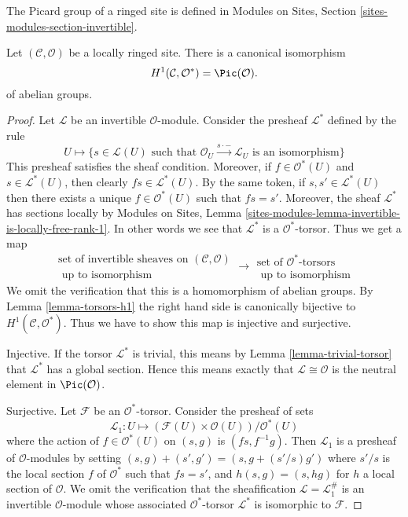 \noindent
The Picard group of a ringed site is defined in
Modules on Sites, Section \ref{sites-modules-section-invertible}.

\begin{lemma}
\label{lemma-h1-invertible}
Let $(\mathcal{C}, \mathcal{O})$ be a locally ringed site.
There is a canonical isomorphism
$$
H^1(\mathcal{C}, \mathcal{O}^*) = \Pic(\mathcal{O}).
$$
of abelian groups.
\end{lemma}

\begin{proof}
Let $\mathcal{L}$ be an invertible $\mathcal{O}$-module.
Consider the presheaf $\mathcal{L}^*$ defined by the rule
$$
U \longmapsto \{s \in \mathcal{L}(U)
\text{ such that } \mathcal{O}_U \xrightarrow{s \cdot -} \mathcal{L}_U
\text{ is an isomorphism}\}
$$
This presheaf satisfies the sheaf condition. Moreover, if
$f \in \mathcal{O}^*(U)$ and $s \in \mathcal{L}^*(U)$, then clearly
$fs \in \mathcal{L}^*(U)$. By the same token, if $s, s' \in \mathcal{L}^*(U)$
then there exists a unique $f \in \mathcal{O}^*(U)$ such that
$fs = s'$. Moreover, the sheaf $\mathcal{L}^*$ has sections locally
by Modules on Sites, Lemma
\ref{sites-modules-lemma-invertible-is-locally-free-rank-1}.
In other words we
see that $\mathcal{L}^*$ is a $\mathcal{O}^*$-torsor. Thus we get
a map
$$
\begin{matrix}
\text{set of invertible sheaves on }(\mathcal{C}, \mathcal{O}) \\
\text{ up to isomorphism}
\end{matrix}
\longrightarrow
\begin{matrix}
\text{set of }\mathcal{O}^*\text{-torsors} \\
\text{ up to isomorphism}
\end{matrix}
$$
We omit the verification that this is a homomorphism of abelian groups.
By
Lemma \ref{lemma-torsors-h1}
the right hand side is canonically
bijective to $H^1(\mathcal{C}, \mathcal{O}^*)$.
Thus we have to show this map is injective and surjective.

\medskip\noindent
Injective. If the torsor $\mathcal{L}^*$ is trivial, this means by
Lemma \ref{lemma-trivial-torsor}
that $\mathcal{L}^*$ has a global section.
Hence this means exactly that $\mathcal{L} \cong \mathcal{O}$ is
the neutral element in $\Pic(\mathcal{O})$.

\medskip\noindent
Surjective. Let $\mathcal{F}$ be an $\mathcal{O}^*$-torsor.
Consider the presheaf of sets
$$
\mathcal{L}_1 : U \longmapsto
(\mathcal{F}(U) \times \mathcal{O}(U))/\mathcal{O}^*(U)
$$
where the action of $f \in \mathcal{O}^*(U)$ on
$(s, g)$ is $(fs, f^{-1}g)$. Then $\mathcal{L}_1$ is a presheaf
of $\mathcal{O}$-modules by setting
$(s, g) + (s', g') = (s, g + (s'/s)g')$ where $s'/s$ is the local
section $f$ of $\mathcal{O}^*$ such that $fs = s'$, and
$h(s, g) = (s, hg)$ for $h$ a local section of $\mathcal{O}$.
We omit the verification that the sheafification
$\mathcal{L} = \mathcal{L}_1^\#$ is an invertible $\mathcal{O}$-module
whose associated $\mathcal{O}^*$-torsor $\mathcal{L}^*$ is isomorphic
to $\mathcal{F}$.
\end{proof}

